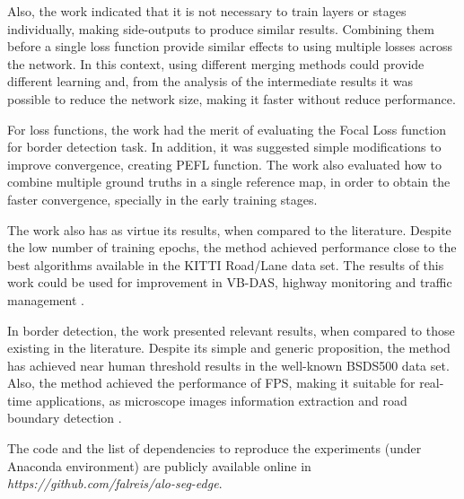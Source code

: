 Also, the work indicated that it is not necessary to train layers or stages individually, making side-outputs to produce similar results.
Combining them before a single loss function provide similar effects to using multiple losses across the network.
In this context, using different merging methods could provide different learning and, from the analysis of the intermediate results it was possible to reduce the network size, making it faster without reduce performance.

For loss functions, the work had the merit of evaluating the Focal Loss \cite{Lin:2017} function for border detection task.
In addition, it was suggested simple modifications to improve convergence, creating PEFL function.
The work also evaluated how to combine multiple ground truths in a single reference map, in order to obtain the faster convergence, specially in the early training stages.

The work also has as virtue its results, when compared to the literature.
Despite the low number of training epochs, the method achieved performance close to the best algorithms available in the KITTI Road/Lane data set.
The results of this work could be used for improvement in VB-DAS, highway monitoring and traffic management \cite{Reis:2019}.

In border detection, the work presented relevant results, when compared to those existing in the literature.
Despite its simple and generic proposition, the method has achieved near human threshold results in the well-known BSDS500 data set.
Also, the method achieved the performance of \myFPS FPS, making it suitable for real-time applications, as microscope images information extraction and road boundary detection \cite{Qu:2020} \cite{Li:2020} \cite{Perng:2020}.


The code and the list of dependencies to reproduce the experiments (under Anaconda environment) are publicly available online in \textit{https://github.com/falreis/alo-seg-edge}.

